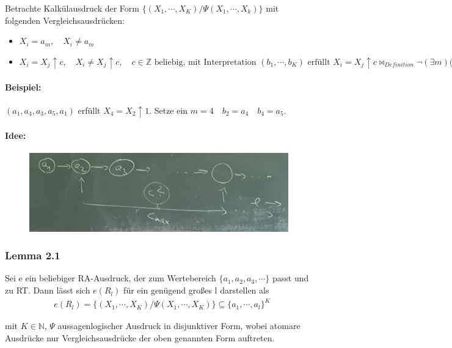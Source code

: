 \documentclass[12pt, a4paper]{article}
\begin{document}
Betrachte Kalkülausdruck der Form $\{ (X_1, \cdots, X_K) / \Psi(X_1, \cdots, X_k) \}$ mit folgenden Vergleichsausdrücken:
\begin{itemize}
\item $X_i = a_m,\quad X_i \neq a_m$
\item $X_i = X_j \uparrow c,\quad X_i \neq X_j \uparrow c, \quad c \in \mathbb{Z} \text{ beliebig, mit Interpretation } (b_1, \cdots, b_K) \text{ erfüllt } X_i = X_j \uparrow c \bowtie_{Definition} \lnot(\exists m)(b_j = a_m \wedge b_i = a_{m+c}$
\end{itemize}

\paragraph{Beispiel:} $(a_1, a_4, a_3, a_5, a_1)$ erfüllt $X_4 = X_2 \uparrow 1$. Setze ein $m=4 \quad b_2 = a_4 \quad b_4 = a_5$.

\paragraph{Idee:}
\begin{figure}[h!]
\centering
\includegraphics[width=0.7\linewidth]{img/img18}
\caption{}
\label{fig:img18}
\end{figure}

\subsubsection*{Lemma 2.1} 
Sei e ein beliebiger RA-Ausdruck, der zum Wertebereich $\{ a_1, a_2, a_3, \cdots \}$ passt und zu RT. Dann lässt sich $e(R_l)$ für ein genügend großes l darstellen als
\begin{align*}
&e(R_l) = \{ (X_1, \cdots, X_K) / \Psi(X_1, \cdots, X_K) \} \subseteq \{ a_1, \cdots, a_l \}^K
\end{align*}

mit $K \in \mathbb{N}$, $\Psi$ aussagenlogischer Ausdruck in disjunktiver Form, wobei atomare Ausdrücke nur Vergleichsausdrücke der oben genannten Form auftreten.
\end{document}
